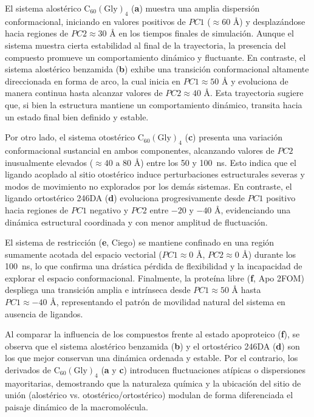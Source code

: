 \begin{table}[htbp]
El sistema alostérico $\text{C}_{60}(\text{Gly})_4$ (\textbf{a}) muestra una amplia dispersión conformacional, iniciando en valores positivos de $PC1$ ($\approx 60\text{ \AA}$) y desplazándose hacia regiones de $PC2 \approx 30\text{ \AA}$ en los tiempos finales de simulación. Aunque el sistema muestra cierta estabilidad al final de la trayectoria, la presencia del compuesto promueve un comportamiento dinámico y fluctuante. En contraste, el sistema alostérico benzamida (\textbf{b}) exhibe una transición conformacional altamente direccionada en forma de arco, la cual inicia en $PC1 \approx 50\text{ \AA}$ y evoluciona de manera continua hasta alcanzar valores de $PC2 \approx 40\text{ \AA}$. Esta trayectoria sugiere que, si bien la estructura mantiene un comportamiento dinámico, transita hacia un estado final bien definido y estable.

Por otro lado, el sistema otostérico $\text{C}_{60}(\text{Gly})_4$ (\textbf{c}) presenta una variación conformacional sustancial en ambos componentes, alcanzando valores de $PC2$ inusualmente elevados ($\approx 40\text{ a }80\text{ \AA}$) entre los 50 y 100~ns. Esto indica que el ligando acoplado al sitio otostérico induce perturbaciones estructurales severas y modos de movimiento no explorados por los demás sistemas. En contraste, el ligando ortostérico 246DA (\textbf{d}) evoluciona progresivamente desde $PC1$ positivo hacia regiones de $PC1$ negativo y $PC2$ entre $-20$ y $-40\text{ \AA}$, evidenciando una dinámica estructural coordinada y con menor amplitud de fluctuación.

El sistema de restricción (\textbf{e}, Ciego) se mantiene confinado en una región sumamente acotada del espacio vectorial ($PC1 \approx 0\text{ \AA}$, $PC2 \approx 0\text{ \AA}$) durante los 100~ns, lo que confirma una drástica pérdida de flexibilidad y la incapacidad de explorar el espacio conformacional. Finalmente, la proteína libre (\textbf{f}, Apo 2FOM) despliega una transición amplia e intrínseca desde $PC1 \approx 50\text{ \AA}$ hasta $PC1 \approx -40\text{ \AA}$, representando el patrón de movilidad natural del sistema en ausencia de ligandos.

Al comparar la influencia de los compuestos frente al estado apoproteico (\textbf{f}), se observa que el sistema alostérico benzamida (\textbf{b}) y el ortostérico 246DA (\textbf{d}) son los que mejor conservan una dinámica ordenada y estable. Por el contrario, los derivados de $\text{C}_{60}(\text{Gly})_4$ (\textbf{a} y \textbf{c}) introducen fluctuaciones atípicas o dispersiones mayoritarias, demostrando que la naturaleza química y la ubicación del sitio de unión (alostérico vs. otostérico/ortostérico) modulan de forma diferenciada el paisaje dinámico de la macromolécula.



\end{table}
